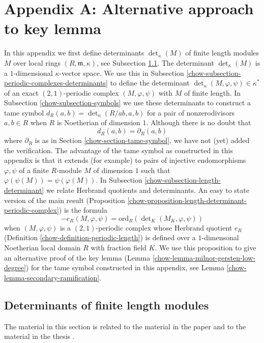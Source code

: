 \section{Appendix A: Alternative approach to key lemma}
\label{chow-section-appendix-A}
In this appendix we first define determinants $\det_\kappa(M)$
of finite length modules $M$ over local rings $(R, \mathfrak m, \kappa)$,
see Subsection \ref{chow-subsection-determinants-finite-length}.
The determinant $\det_\kappa(M)$ is a $1$-dimensional $\kappa$-vector space.
We use this in Subsection \ref{chow-subsection-periodic-complexes-determinants}
to define the determinant $\det_\kappa(M, \varphi, \psi) \in \kappa^*$
of an exact $(2, 1)$-periodic complex $(M, \varphi, \psi)$
with $M$ of finite length. In Subsection \ref{chow-subsection-symbols}
we use these determinants to construct a tame symbol
$d_R(a, b) = \det_\kappa(R/ab, a, b)$ for a pair of nonzerodivisors
$a, b \in R$ when $R$ is Noetherian of dimension $1$.
Although there is no doubt that
$$
d_R(a, b) = \partial_R(a, b)
$$
where $\partial_R$ is as in Section \ref{chow-section-tame-symbol},
we have not (yet) added the verification. The advantage of the
tame symbol as constructed in this appendix is that it extends
(for example) to pairs of injective endomorphisms $\varphi, \psi$
of a finite $R$-module $M$ of dimension $1$ such that
$\varphi(\psi(M)) = \psi(\varphi(M))$. In
Subsection \ref{chow-subsection-length-determinant}
we relate Herbrand quotients and determinants.
An easy to state version of the main result
(Proposition \ref{chow-proposition-length-determinant-periodic-complex})
is the formula
$$
-e_R(M, \varphi, \psi) =
\text{ord}_R(\det\nolimits_K(M_K, \varphi, \psi))
$$
when $(M, \varphi, \psi)$ is a $(2, 1)$-periodic complex
whose Herbrand quotient $e_R$ (Definition \ref{chow-definition-periodic-length})
is defined
over a $1$-dimensonal Noetherian local domain $R$ with fraction field $K$.
We use this proposition to give an alternative proof of the key lemma
(Lemma \ref{chow-lemma-milnor-gersten-low-degree})
for the tame symbol constructed in this appendix, see
Lemma \ref{chow-lemma-secondary-ramification}.


\subsection{Determinants of finite length modules}
\label{chow-subsection-determinants-finite-length}

The material in this section is related to the material in
the paper \cite{determinant} and to the material in the
thesis \cite{Joe}.

